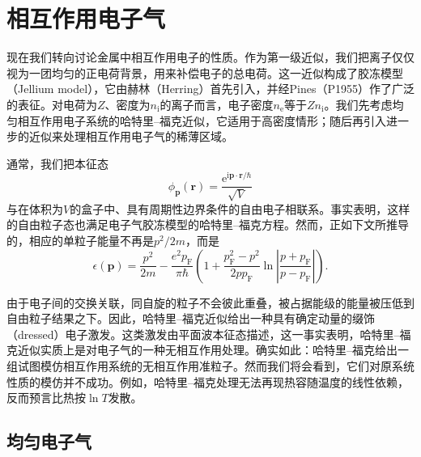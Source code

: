 \chapter{相互作用电子气}

现在我们转向讨论金属中相互作用电子的性质。作为第一级近似，我们把离子仅仅视为一团均匀的正电荷背景，用来补偿电子的总电荷。这一近似构成了胶冻模型（Jellium model），它由赫林（Herring）首先引入，并经Pines（P1955）作了广泛的表征。对电荷为$Z$、密度为$n_{\mathrm{i}}$的离子而言，电子密度$n_{\mathrm{e}}$等于$Zn_{\mathrm{i}}$。我们先考虑均匀相互作用电子系统的哈特里–福克近似，它适用于高密度情形；随后再引入进一步的近似来处理相互作用电子气的稀薄区域。

通常，我们把本征态
\begin{equation*}
\phi_{\mathbf{p}}(\mathbf{r}) = \frac{\mathrm{e}^{\mathrm{i}\mathbf{p}\cdot\mathbf{r}/\hbar}}{\sqrt{V}}
\tag{6.1}
\end{equation*}
与在体积为$V$的盒子中、具有周期性边界条件的自由电子相联系。事实表明，这样的自由粒子态也满足电子气胶冻模型的哈特里–福克方程。然而，正如下文所推导的，相应的单粒子能量不再是$p^2/2m$，而是
\begin{equation*}
\epsilon(\mathbf{p}) = \frac{p^2}{2m} - \frac{e^2 p_{\mathrm{F}}}{\pi\hbar}\left(1 + \frac{p_{\mathrm{F}}^2 - p^2}{2pp_{\mathrm{F}}}\ln\left|\frac{p + p_{\mathrm{F}}}{p - p_{\mathrm{F}}}\right|\right).
\tag{6.2}
\end{equation*}

由于电子间的交换关联，同自旋的粒子不会彼此重叠，被占据能级的能量被压低到自由粒子结果之下。因此，哈特里–福克近似给出一种具有确定动量的缀饰（dressed）电子激发。这类激发由平面波本征态描述，这一事实表明，哈特里–福克近似实质上是对电子气的一种无相互作用处理。确实如此：哈特里–福克给出一组试图模仿相互作用系统的无相互作用准粒子。然而我们将会看到，它们对原系统性质的模仿并不成功。例如，哈特里–福克处理无法再现热容随温度的线性依赖，反而预言比热按$\ln T$发散。

\section{均匀电子气}


